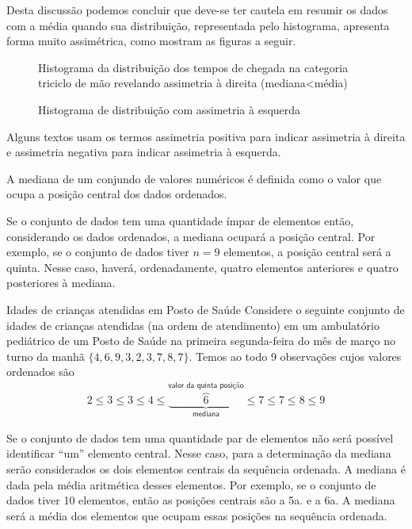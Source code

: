 Desta discussão podemos concluir que deve-se ter cautela em resumir os dados com a média quando sua distribuição, representada pelo histograma, apresenta forma muito assimétrica, como mostram as figuras a seguir.

\begin{figure}[H]
\centering
\capstart

\noindent{}
\caption{Histograma da distribuição dos tempos de chegada na categoria triciclo de mão revelando assimetria à direita (mediana\textless{}média)}\label{\detokenize{PE104-1:fig-assimetriaadireita}}\label{\detokenize{PE104-1:id14}}\end{figure}

\begin{figure}[H]
\centering
\capstart

\noindent{}
\caption{Histograma de distribuição com assimetria à esquerda}\label{\detokenize{PE104-1:fig-assimetriaaesquerda}}\label{\detokenize{PE104-1:id15}}\end{figure}

Alguns textos usam os termos assimetria positiva para indicar assimetria à direita e assimetria negativa para indicar assimetria à esquerda.


A mediana de um conjundo de valores numéricos é definida como o valor que ocupa a posição central dos dados ordenados.

Se o conjunto de dados tem uma quantidade ímpar de elementos então, considerando os dados ordenados, a mediana ocupará a posição central. Por exemplo, se o conjunto de dados tiver \(n=9\) elementos,  a posição central será a quinta. Nesse caso, haverá, ordenadamente, quatro elementos anteriores e quatro posteriores à mediana.


\begin{example}{Idades de crianças atendidas em Posto de Saúde}
Considere o seguinte conjunto de idades de crianças atendidas (na ordem de atendimento) em um ambulatório pediátrico de um Posto de Saúde na primeira segunda-feira do mês de março no turno da manhã \(\{4,6,9,3,2,3,7,8,7\}\). Temos ao todo 9 observações cujos valores ordenados são
\begin{equation*}
\begin{split}2 \leq 3 \leq 3 \leq 4 \leq \underbrace{\overbrace{6}^{\textsf{valor da quinta posição}}}_{\textsf{mediana}} \leq 7 \leq 7 \leq 8 \leq 9\end{split}
\end{equation*}
\end{example}
Se o conjunto de dados tem uma quantidade par de elementos não será possível identificar “um” elemento central. Nesse caso, para a determinação da mediana serão considerados os dois elementos centrais da sequência ordenada. A mediana é dada pela média aritmética desses elementos. Por exemplo, se o conjunto de dados tiver 10 elementos, então as posições centrais são a 5a. e a 6a. A mediana será a média dos elementos que ocupam essas posições na sequência ordenada.


